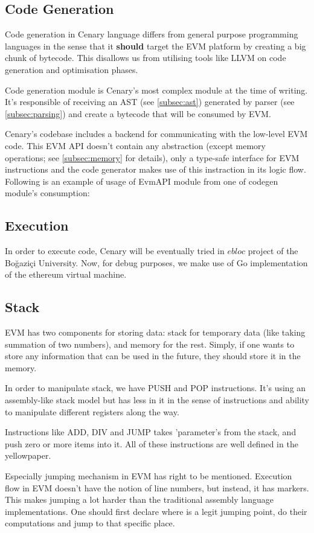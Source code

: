 \documentclass{article}
\begin{document}
\subsection{Code Generation}
\label{subsec:code_generation}
\par Code generation in Cenary language differs from general purpose programming languages in the sense that it \textbf{should} target the EVM platform by creating a big chunk of bytecode. This disallows us from utilising tools like LLVM\cite{llvm} on code generation and optimisation phases.
\par Code generation module is Cenary's most complex module at the time of writing. It's responsible of receiving an AST (see \ref{subsec:ast}) generated by parser (see \ref{subsec:parsing}) and create a bytecode that will be consumed by EVM.
\par Cenary's codebase includes a backend for communicating with the low-level EVM code. This EVM API doesn't contain any abstraction (except memory operations; see \ref{subsec:memory} for details), only a type-safe interface for EVM instructions and the code generator makes use of this instraction in its logic flow. Following is an example of usage of EvmAPI module from one of codegen module's consumption:
\newpage

\subsection{Execution}
\label{subsec:execution}
In order to execute code, Cenary will be eventually tried in $ebloc$ project of the Boğaziçi University. Now, for debug purposes, we make use of Go\cite{go} implementation of the ethereum virtual machine\cite{ethereum-go}.
\subsection{Stack}
\label{subsec:stack}
EVM has two components for storing data: stack for temporary data (like taking summation of two numbers), and memory for the rest. Simply, if one wants to store any information that can be used in the future, they should store it in the memory.
\par In order to manipulate stack, we have PUSH and POP instructions. It's using an assembly-like stack model but has less in it in the sense of instructions and ability to manipulate different registers along the way.
\par Instructions like ADD, DIV and JUMP takes 'parameter's from the stack, and push zero or more items into it. All of these instructions are well defined in the yellowpaper\cite{yellowpaper}.
\par Especially jumping mechanism in EVM has right to be mentioned. Execution flow in EVM doesn't have the notion of line numbers, but instead, it has markers. This makes jumping a lot harder than the traditional assembly language implementations. One should first declare where is a legit jumping point, do their computations and jump to that specific place.
\end{document}
